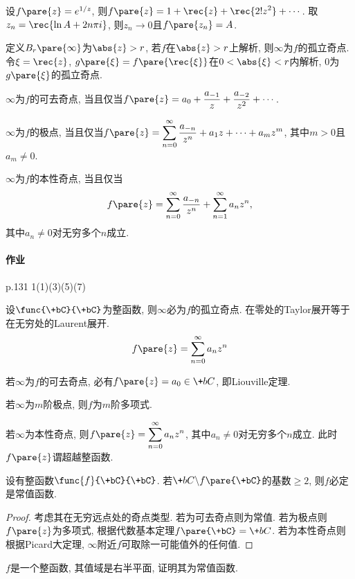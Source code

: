 \documentclass[../ComplexVariable.tex]{subfiles}
\begin{document}
\begin{ex}
    设$f\pare{z} = e^{1/z}$, 则$f\pare{z} = \displaystyle 1 + \rec{z} + \rec{2!z^2} + \cdots$. 取$z_n = \displaystyle\rec{\ln A + 2n\pi i}$, 则$z_n\rightarrow 0$且$f\pare{z_n} = A$.
\end{ex}
定义$B_r\pare{\infty}$为$\abs{z}>r$, 若$f$在$\abs{z} > r$上解析, 则$\infty$为$f$的孤立奇点. 令$\xi = \displaystyle \rec{z}$, $g\pare{\xi} = \displaystyle f\pare{\rec{\xi}}$在$0<\abs{\xi}<r$内解析, $0$为$g\pare{\xi}$的孤立奇点.
\begin{theorem}
    $\infty$为$f$的可去奇点, 当且仅当$f\pare{z} = \displaystyle a_0 + \frac{a_{-1}}{z} + \frac{a_{-2}}{z^2} + \cdots$.
\end{theorem}
\begin{theorem}
    $\infty$为$f$的极点, 当且仅当$f\pare{z} = \displaystyle \sum_{n=0}^\infty \frac{a_{-n}}{z^n} + a_1 z + \cdots + a_mz^m$, 其中$m>0$且$a_m\neq 0$.
\end{theorem}
\begin{theorem}
    $\infty$为$f$的本性奇点, 当且仅当
    \[ f\pare{z} = \sum_{n=0}^\infty \frac{a_{-n}}{z^n} + \sum_{n=1}^\infty a_n z^n, \]
    其中$a_n\neq 0$对无穷多个$n$成立.
\end{theorem}

\paragraph{作业} %
\label{par:作业}

p.131 1(1)(3)(5)(7)


\par
设$\func{\+bC}{\+bC}$为整函数, 则$\infty$必为$f$的孤立奇点. 在零处的Taylor展开等于在无穷处的Laurent展开.
\[ f\pare{z} = \sum_{n=0}^\infty a_n z^n  \]
\begin{cenum}
    \item 若$\infty$为$f$的可去奇点, 必有$f\pare{z} = a_0 \in \+bC$, 即Liouville定理.
    \item 若$\infty$为$m$阶极点, 则$f$为$m$阶多项式.
    \item 若$\infty$为本性奇点, 则$f\pare{z} = \displaystyle \sum_{n=0}^\infty a_nz^n$, 其中$a_n\neq 0$对无穷多个$n$成立. 此时$f\pare{z}$谓超越整函数.
\end{cenum}

\begin{theorem}[Picard小定理]
    设有整函数$\func{f}{\+bC}{\+bC}$. 若$\+bC\backslash f\pare{\+bC}$的基数$\ge 2$, 则$f$必定是常值函数.
\end{theorem}
\begin{proof}
    考虑其在无穷远点处的奇点类型. 若为可去奇点则为常值. 若为极点则$f\pare{z}$为多项式, 根据代数基本定理$f\pare{\+bC} = \+bC$. 若为本性奇点则根据Picard大定理, $\infty$附近$f$可取除一可能值外的任何值.
\end{proof}
\begin{ex}
    $f$是一个整函数, 其值域是右半平面, 证明其为常值函数.
\end{ex}
\end{document}
